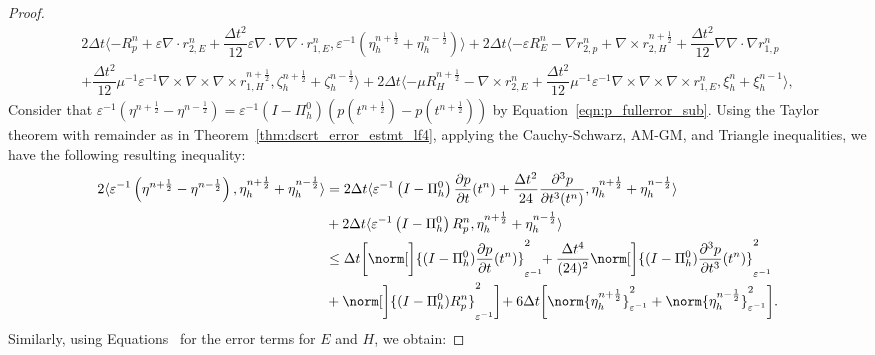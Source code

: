 \documentclass{amsart}
\theoremstyle{thmstyleone}%
\theoremstyle{thmstyletwo}%
\theoremstyle{thmstylethree}%
\newcommand{\ainnerproduct}[2]{\langle #1, #2 \rangle}
\begin{document}
\begin{proof}
\begin{multline}
2 \Delta t \ainnerproduct{- R_p^n + \varepsilon \nabla \cdot r_{2,E}^n + \dfrac{\Delta t^2}{12}  \varepsilon \nabla \cdot \nabla \nabla \cdot r_{1,E}^n}{\varepsilon^{-1} \left( \eta^{n + \frac{1}{2}}_h + \eta^{n - \frac{1}{2}}_h \right)} + 2 \Delta t \ainnerproduct{-\varepsilon R_E^n - \nabla r_{2,p}^n + \nabla \times r_{2,H}^{n + \frac{1}{2}} + \dfrac{\Delta t^2}{12} \nabla \nabla \cdot \nabla r_{1,p}^n\\ + \dfrac{\Delta t^2}{12} \mu^{-1} \varepsilon^{-1} \nabla \times \nabla \times \nabla \times r_{1,H}^{n + \frac{1}{2}}}{\zeta^{n + \frac{1}{2}}_h + \zeta^{n - \frac{1}{2}}_h}  + 2 \Delta t \ainnerproduct{-\mu R_H^{n + \frac{1}{2}} - \nabla \times r_{2,E}^n + \dfrac{\Delta t^2}{12} \mu^{-1} \varepsilon^{-1} \nabla \times \nabla \times \nabla \times r_{1,E}^n}{\xi^n_h + \xi^{n - 1}_h}, \label{eqn:suberror_p+E+H_lf4}
\end{multline}
Consider that  $\varepsilon^{-1} \left(\eta^{n + \frac{1}{2}} - \eta^{n - \frac{1}{2}}\right) = \varepsilon^{-1} \left(I - \Pi_h^0\right) \left( p(t^{n + \frac{1}{2}}) - p(t^{n + \frac{1}{2}})\right)$ by Equation~\eqref{eqn:p_fullerror_sub}. Using the Taylor theorem with remainder as in Theorem~\ref{thm:dscrt_error_estmt_lf4}, applying the Cauchy-Schwarz, AM-GM, and Triangle inequalities, we have the following resulting inequality:
\begin{align*}
2 \ainnerproduct{\varepsilon^{-1} \left( \eta^{n + \frac{1}{2}} - \eta^{n - \frac{1}{2}} \right)}{\eta^{n + \frac{1}{2}}_h + \eta^{n - \frac{1}{2}}_h} & = 2 \Delta t \ainnerproduct{\varepsilon^{-1} \left( I - \Pi_h^0 \right) \dfrac{\partial p}{\partial t} (t^n) +  \dfrac{\Delta t^2}{24} \dfrac{\partial^3 p}{\partial t^3 (t^n) }}{\eta^{n + \frac{1}{2}}_h + \eta^{n - \frac{1}{2}}_h} \\ & + 2 \Delta t \ainnerproduct{\varepsilon^{-1} \left( I - \Pi_h^0 \right) R_p^n}{\eta^{n + \frac{1}{2}}_h + \eta^{n - \frac{1}{2}}_h} \\ 
 & \le \Delta t \bigg[ \norm[\bigg]{(I - \Pi_h^0) \dfrac{\partial p}{\partial t}(t^n)}^2_{\varepsilon^{-1}} \!\! + \dfrac{\Delta t^4}{(24)^2} \norm[\bigg]{(I - \Pi_h^0) \dfrac{\partial^3 p}{\partial t^3}(t^n)}^2_{\varepsilon^{-1}} \!\! \\ & +  \norm[\bigg]{(I - \Pi_h^0) R_p^n}^2_{\varepsilon^{-1}} \bigg] \! + 6 \Delta t \bigg[ \norm{\eta_h^{n + \frac{1}{2}}}^2_{\varepsilon^{-1}} + \norm{\eta_h^{n - \frac{1}{2}}}^2_{\varepsilon^{-1}} \bigg].
\end{align*}
Similarly, using Equations~ for the error terms for $E$ and $H$, we obtain:

\end{proof}
\end{document}
